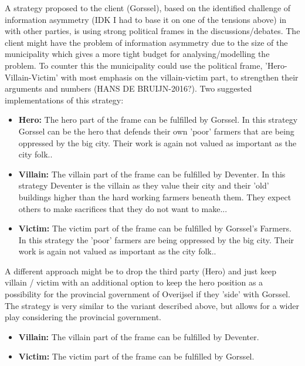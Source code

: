A strategy proposed to the client (Gorssel), based on the identified challenge of information asymmetry (IDK I had to base it on one of the tensions above) in with other parties, is using strong political frames in the discussions/debates. The client might have the problem of information asymmetry due to the size of the municipality which gives a more tight budget for analysing/modelling the problem. To counter this the municipality could use the political frame, 'Hero-Villain-Victim' with most emphasis on the villain-victim part, to strengthen their arguments and numbers (HANS DE BRUIJN-2016?). Two suggested implementations of this strategy:
\begin{itemize}
    \item \textbf{Hero:} The hero part of the frame can be fulfilled by Gorssel. In this strategy Gorssel can be the hero that defends their own 'poor' farmers that are being oppressed by the big city. Their work is again not valued as important as the city folk.. 
    \item \textbf{Villain:} The villain part of the frame can be fulfilled by Deventer. In this strategy Deventer is the villain as they value their city and their 'old' buildings higher than the hard working farmers beneath them. They expect others to make sacrifices that they do not want to make...
    \item \textbf{Victim:} The victim part of the frame can be fulfilled by Gorssel's Farmers. In this strategy the 'poor' farmers  are being oppressed by the big city. Their work is again not valued as important as the city folk..
\end{itemize}

\noindent A different approach might be to drop the third party (Hero) and just keep villain / victim with an additional option to keep the hero position as a possibility for the provincial government of Overijsel if they 'side' with Gorssel. The strategy is very similar to the variant described above, but allows for a wider play considering the provincial government. 
\begin{itemize}
    \item \textbf{Villain:} The villain part of the frame can be fulfilled by Deventer.
    \item \textbf{Victim:} The victim part of the frame can be fulfilled by Gorssel.
\end{itemize}

